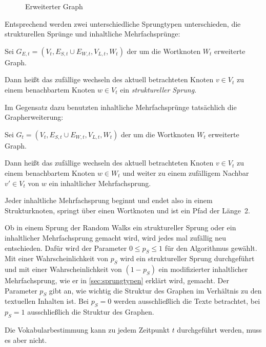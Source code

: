 \begin{figure}[htp]
    \centering
    
    \caption{Erweiterter Graph}
    \label{fig:erweiterter-graph}
\end{figure}

Entsprechend werden zwei unterschiedliche Sprungtypen unterschieden,
die strukturellen Sprünge und inhaltliche Mehrfachsprünge:

\begin{definition}
    Sei $G_{E,t} = (V_t, E_{S,t} \cup E_{W,t}, V_{L,t}, W_{t})$ der
    um die Wortknoten $W_{t}$ erweiterte Graph.

    Dann heißt das zufällige wechseln des aktuell betrachteten
    Knoten $v \in V_t$ zu einem benachbartem Knoten $w \in V_t$
    ein \textit{struktureller Sprung}.
\end{definition}
\goodbreak
Im Gegensatz dazu benutzten inhaltliche Mehrfachsprünge
tatsächlich die Grapherweiterung:
\begin{definition}
    Sei $G_t = (V_t, E_{S,t} \cup E_{W,t}, V_{L,t}, W_{t})$ der
    um die Wortknoten $W_{t}$ erweiterte Graph.

    Dann heißt das zufällige wechseln des aktuell betrachteten
    Knoten $v \in V_t$ zu einem benachbartem Knoten $w \in W_t$
    und weiter zu einem zufälligem Nachbar $v' \in V_t$ von $w$
    ein inhaltlicher Mehrfachsprung.
\end{definition}

Jeder inhaltliche Mehrfachsprung beginnt und endet also in einem Strukturknoten,
springt über einen Wortknoten und ist ein Pfad der Länge~2.

Ob in einem Sprung der Random Walks ein struktureller Sprung oder
ein inhaltlicher Mehrfachsprung gemacht wird, wird jedes mal zufällig
neu entschieden. Dafür wird der Parameter $0 \leq p_S \leq 1$ für den Algorithmus 
gewählt. Mit einer Wahrscheinlichkeit von $p_S$ wird ein struktureller
Sprung durchgeführt und mit einer Wahrscheinlichkeit
von $(1-p_S)$ ein modifizierter inhaltlicher Mehrfachsprung, wie er in
\cref{sec:sprungtypen} erklärt wird, gemacht. Der 
Parameter $p_S$ gibt an, wie wichtig die Struktur des Graphen im Verhältnis
zu den textuellen Inhalten ist. Bei $p_S = 0$ werden ausschließlich
die Texte betrachtet, bei $p_S = 1$ ausschließlich die Struktur des
Graphen.

Die Vokabularbestimmung kann zu jedem Zeitpunkt $t$ durchgeführt 
werden, muss es aber nicht.

